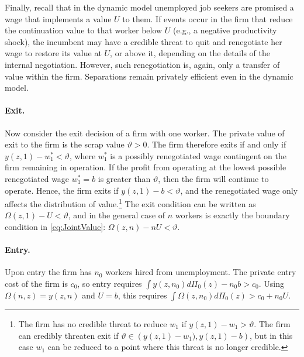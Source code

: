 Finally, recall that in the dynamic model unemployed job seekers are promised a wage that implements a value $U$ to them. If events occur in the firm that reduce the continuation value to that worker below $U$ (e.g., a negative productivity shock), the incumbent may have a credible threat to quit and renegotiate her wage to restore its value at $U$, or above it, depending on the details of the internal negotiation. However, such renegotiation is, again, only a transfer of value within the firm. Separations remain privately efficient even in the dynamic model.

\vspace*{-.2cm}\paragraph{Exit.}
Now consider the exit decision of a firm with one worker. The private value of exit to the firm is the scrap value $\vartheta>0$. The firm therefore exits if and only if 
$y(z,1) - w_1^* <\vartheta$, where $w_1^\ast$ is a possibly renegotiated wage contingent on the firm remaining in operation.
If the profit from operating at the lowest possible renegotiated wage $w_1^\ast=b$ is greater than $\vartheta$, then the firm will continue to operate.
Hence, the firm exits if 
$y(z,1) - b <\vartheta$, and the renegotiated wage only affects the distribution of value.\footnote{
    The firm has no credible threat to reduce $w_1$ if $y(z,1)-w_1>\vartheta$.
    The firm can credibly threaten exit if $\vartheta\in\left(y(z,1)-w_1) ,y(z,1)-b\right)$, but in this case $w_1$ can be reduced to a point where this threat is no longer credible.
}
The exit condition can be written as $\Omega(z,1) - U < \vartheta$, and in the general case of $n$ workers is exactly the boundary condition in \eqref{eq:JointValue}: $\Omega \left( z,n\right) - nU < \vartheta.$

\vspace*{-.3cm}
\paragraph{Entry.}
Upon entry the firm has $n_0$ workers hired from unemployment. The private entry cost of the firm is $c_0$, so entry requires $\int y(z,n_0)d\Pi_{0}(z) - n_0 b > c_0$.
Using $\Omega(n,z) = y(z,n)$ and $U=b$, this requires $\int\Omega\left( z,n_0\right)d\Pi_{0}(z) > c_0 + n_0U$.

